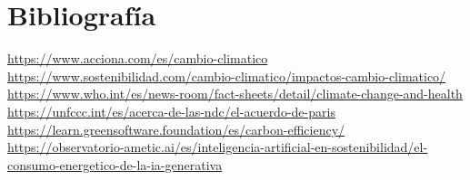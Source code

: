 \documentclass[12pt,a4paper]{report}
\begin{document}
\chapter*{Bibliografía}
\begin{thebibliography}{99}
  \hypertarget{bib:1}{}\href{https://www.acciona.com/es/cambio-climatico}{https://www.acciona.com/es/cambio-climatico}
  \hypertarget{bib:2}{}\href{https://www.sostenibilidad.com/cambio-climatico/impactos-cambio-climatico/}{https://www.sostenibilidad.com/cambio-climatico/impactos-cambio-climatico/}
  \hypertarget{bib:3}{}\href{https://www.who.int/es/news-room/fact-sheets/detail/climate-change-and-health}{https://www.who.int/es/news-room/fact-sheets/detail/climate-change-and-health}
  \hypertarget{bib:4}{}\href{https://unfccc.int/es/acerca-de-las-ndc/el-acuerdo-de-paris}{https://unfccc.int/es/acerca-de-las-ndc/el-acuerdo-de-paris}
  \hypertarget{bib:5}{}\href{https://learn.greensoftware.foundation/es/carbon-efficiency/}{https://learn.greensoftware.foundation/es/carbon-efficiency/}
  \hypertarget{bib:6}{}\href{https://observatorio-ametic.ai/es/inteligencia-artificial-en-sostenibilidad/el-consumo-energetico-de-la-ia-generativa}{https://observatorio-ametic.ai/es/inteligencia-artificial-en-sostenibilidad/el-consumo-energetico-de-la-ia-generativa}
\end{thebibliography}
\end{document}
